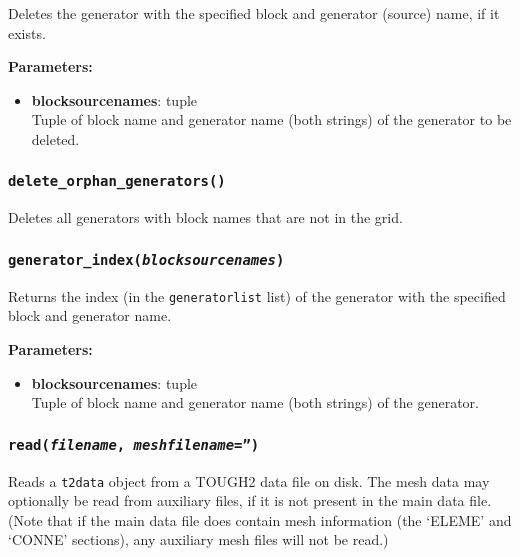 Deletes the generator with the specified block and generator (source) name, if it exists.

\textbf{Parameters:}
\begin{itemize}
\item \textbf{blocksourcenames}: tuple\\
  Tuple of block name and generator name (both strings) of the generator to be deleted.
\end{itemize}

\begin{snugshade}
\subsubsection{\texttt{delete\_orphan\_generators()}}
\end{snugshade}
\label{sec:t2data:delete_orphan_generators}

Deletes all generators with block names that are not in the grid.

\begin{snugshade}
\subsubsection{\texttt{generator\_index(\emph{blocksourcenames})}}
\end{snugshade}
\label{sec:t2data:generator_index}

Returns the index (in the \texttt{generatorlist} list) of the generator with the specified block and generator name.

\textbf{Parameters:}
\begin{itemize}
\item \textbf{blocksourcenames}: tuple\\
  Tuple of block name and generator name (both strings) of the generator.
\end{itemize}

\begin{snugshade}
\subsubsection{\texttt{read(\emph{filename}, \emph{meshfilename}='')}}
\end{snugshade}
\label{sec:t2data:read}

Reads a \texttt{t2data} object from a TOUGH2 data file on disk.  The mesh data may optionally be read from auxiliary files, if it is not present in the main data file.  (Note that if the main data file does contain mesh information (the `ELEME' and `CONNE' sections), any auxiliary mesh files will not be read.)

